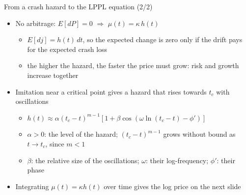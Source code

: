 \begin{frame}{From a crash hazard to the LPPL equation (2/2)}
\itemsize{\footnotesize}
\begin{itemize}
    \item No arbitrage: $E[dP] = 0$ $\Rightarrow$ $\mu(t) = \kappa\, h(t)$
    \begin{itemize}
        \item $E[dj] = h(t)\,dt$, so the expected change is zero only if the drift pays for the expected crash loss
        \item the higher the hazard, the faster the price must grow: risk and growth increase together
    \end{itemize}
    \item Imitation near a critical point gives a hazard that rises towards $t_c$ with oscillations
    \begin{itemize}
        \item $h(t) \approx \alpha (t_c - t)^{m-1}[1 + \beta\cos(\omega \ln(t_c - t) - \phi')]$
        \item $\alpha > 0$: the level of the hazard; $(t_c - t)^{m-1}$ grows without bound as $t \to t_c$, since $m < 1$
        \item $\beta$: the relative size of the oscillations; $\omega$: their log-frequency; $\phi'$: their phase
    \end{itemize}
    \item Integrating $\mu(t) = \kappa h(t)$ over time gives the log price on the next slide
\end{itemize}
\end{frame}


